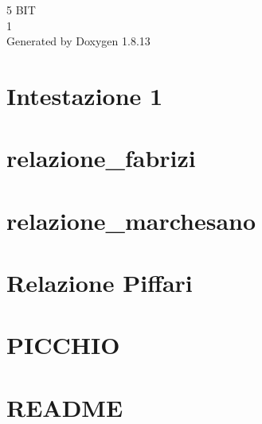 \documentclass[twoside]{book}
\newcommand{\+}{\discretionary{\mbox{\scriptsize$\hookleftarrow$}}{}{}}
\newcommand{\clearemptydoublepage}{%
  \newpage{\pagestyle{empty}\cleardoublepage}%
}
\begin{document}
\hypersetup{pageanchor=false,
             bookmarksnumbered=true,
             pdfencoding=unicode
            }
\begin{titlepage}
\vspace*{7cm}
\begin{center}%
{\Large 5 B\+IT \\[1ex]\large 1 }\\
\vspace*{1cm}
{\large Generated by Doxygen 1.8.13}\\
\end{center}
\end{titlepage}
\clearemptydoublepage
{}
\tableofcontents
\clearemptydoublepage
{}
\hypersetup{pageanchor=true}

\chapter{Intestazione 1}
\label{md_documenti_documentazione_prova}

\chapter{relazione\+\_\+fabrizi}
\label{md_documenti_documentazione_relazione_fabrizi}

\chapter{relazione\+\_\+marchesano}
\label{md_documenti_documentazione_relazione_marchesano}

\chapter{Relazione Piffari}
\label{md_documenti_documentazione_relazione_piffari}

\chapter{P\+I\+C\+C\+H\+IO}
\label{md_documenti_PICCHIO}

\chapter{R\+E\+A\+D\+ME}
\label{md_manuali_sito_css_README}

\end{document}
